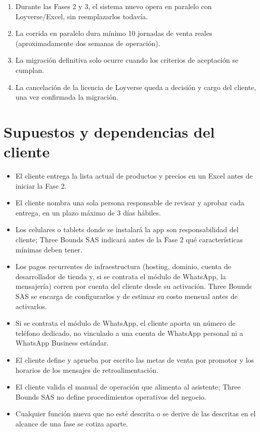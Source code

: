 \documentclass[11pt,a4paper]{article}
\begin{document}
\vspace{8pt}
\begin{enumerate}
    \item Durante las Fases 2 y 3, el sistema nuevo opera en paralelo con Loyverse/Excel,
    sin reemplazarlos todavía.
    \item La corrida en paralelo dura mínimo 10 jornadas de venta reales
    (aproximadamente dos semanas de operación).
    \item La migración definitiva solo ocurre cuando los criterios de aceptación se
    cumplan.
    \item La cancelación de la licencia de Loyverse queda a decisión y cargo del cliente,
    una vez confirmada la migración.
\end{enumerate}

\section{Supuestos y dependencias del cliente}\label{sec:supuestos}
\begin{itemize}
    \item El cliente entrega la lista actual de productos y precios en un Excel antes
    de iniciar la Fase 2.
    \item El cliente nombra una sola persona responsable de revisar y aprobar cada
    entrega, en un plazo máximo de 3 días hábiles.
    \item Los celulares o tablets donde se instalará la app son responsabilidad del
    cliente; Three Bounds SAS indicará antes de la Fase 2 qué características mínimas
    deben tener.
    \item Los pagos recurrentes de infraestructura (hosting, dominio, cuenta de
    desarrollador de tienda y, si se contrata el módulo de WhatsApp, la mensajería)
    corren por cuenta del cliente desde su activación. Three Bounds SAS se encarga de
    configurarlos y de estimar su costo mensual antes de activarlos.
    \item Si se contrata el módulo de WhatsApp, el cliente aporta un número de teléfono
    dedicado, no vinculado a una cuenta de WhatsApp personal ni a WhatsApp Business estándar.
    \item El cliente define y aprueba por escrito las metas de venta por promotor y los
    horarios de los mensajes de retroalimentación.
    \item El cliente valida el manual de operación que alimenta al asistente;
    Three Bounds SAS no define procedimientos operativos del negocio.
    \item Cualquier función nueva que no esté descrita o se derive de las descritas en
    el alcance de una fase se cotiza aparte.
\end{itemize}
\end{document}
